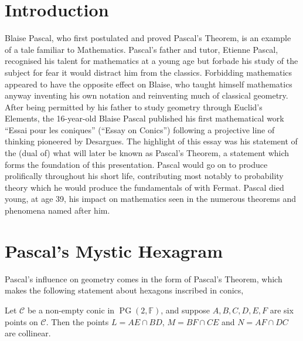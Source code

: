 \documentclass[
10pt, %
a4paper, %
oneside, %
headinclude,footinclude, %
BCOR5mm, %
]{scrartcl}
\DeclareMathOperator*{\PG}{\mathrm{PG}}
\begin{document}

\newpage %


\section{Introduction}

Blaise Pascal, who first postulated and proved Pascal's Theorem, is an example of a tale familiar to Mathematics. Pascal's father and tutor, Etienne Pascal, recognised his talent for mathematics at a young age but forbade his
study of the subject for fear it would distract him from the classics. Forbidding mathematics appeared to have the opposite effect on Blaise, who taught himself mathematics anyway inventing his own notation and reinventing much of
classical geometry. After being permitted by his father to study geometry through Euclid's Elements, the 16-year-old Blaise Pascal published his first mathematical work ``Essai pour les coniques'' (``Essay on Conics'') following a projective line of thinking pioneered by Desargues.
The highlight of this essay was his statement of the (dual of) what will later be known as Pascal's Theorem, a statement which forms the foundation of this presentation. Pascal would go on to produce prolifically throughout his short life,
contributing most notably to probability theory which he would produce the fundamentals of with Fermat. Pascal died young, at age 39, his impact on mathematics seen in the numerous theorems and phenomena named after him.

\section{Pascal's Mystic Hexagram}

Pascal's influence on geometry comes in the form of Pascal's Theorem, which makes the following statement about hexagons inscribed in conics,

\begin{theorem}
    Let \(\mathcal{C}\) be a non-empty conic in \(\PG(2, \mathbb{F})\), and suppose \(A, B, C, D, E, F\) are six points on \(\mathcal{C}\). Then the points
    \(L = AE \cap BD\), \(M = BF \cap CE\) and \(N = AF \cap DC\) are collinear.
\end{theorem}
\end{document}
